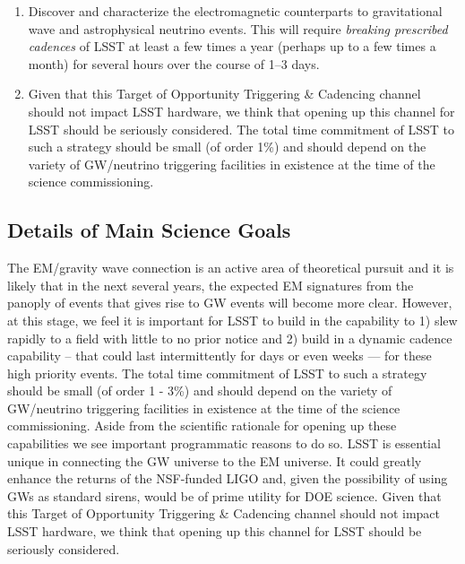 \documentclass [11pt]{article}
\begin{document}
\begin{enumerate}

\item
Discover and characterize the electromagnetic counterparts to gravitational wave and astrophysical neutrino events. This will require {\it breaking prescribed cadences} of LSST at least a few times a year (perhaps up to a few times a month) for several hours over the course of 1--3 days.

\item Given that this Target of Opportunity Triggering \& Cadencing channel should not impact LSST hardware, we think that opening up this channel for LSST should be seriously considered. The total time commitment of LSST to such a strategy should be small (of order 1\%) and should depend on the variety of GW/neutrino triggering facilities in existence at the time of the science commissioning. 


\end{enumerate}

\subsection{Details of Main Science Goals}

%
The EM/gravity wave connection is an active area of theoretical pursuit and it is likely that in the next several years, the expected EM signatures from the panoply of events that gives rise to GW events will become more clear. However, at this stage, we feel it is important for LSST to build in the capability to 1) slew rapidly to a field with little to no prior notice and 2) build in a dynamic cadence capability -- that could last intermittently for days or even weeks --- for these high priority events. The total time commitment of LSST to such a strategy should be small (of order 1 - 3\%) and should depend on the variety of GW/neutrino triggering facilities in existence at the time of the science commissioning. Aside from the scientific rationale for opening up these capabilities we see important programmatic reasons to do so. LSST is essential unique in connecting the GW universe to the EM universe. It could greatly enhance the returns of the NSF-funded LIGO and, given the possibility of using GWs as standard sirens, would be of prime utility for DOE science. Given that this Target of Opportunity Triggering \& Cadencing channel should not impact LSST hardware, we think that opening up this channel for LSST should be seriously considered.
\end{document}

